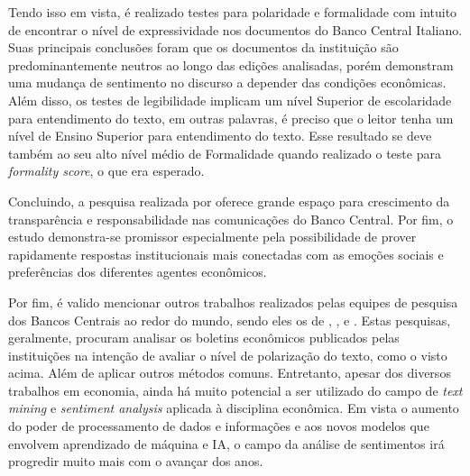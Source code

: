     


Tendo isso em vista, é realizado testes para polaridade e formalidade com intuito de encontrar o nível de expressividade nos documentos do Banco Central Italiano. Suas principais conclusões foram que os documentos da instituição são predominantemente neutros ao longo das edições analisadas, porém demonstram uma mudança de sentimento no discurso a depender das condições econômicas. Além disso, os testes de legibilidade implicam um nível Superior de escolaridade para entendimento do texto, em outras palavras, é preciso que o leitor tenha um nível de Ensino Superior para entendimento do texto. Esse resultado se deve também ao seu alto nível médio de Formalidade quando realizado o teste para \textit{formality score}, o que era esperado.

Concluindo, a pesquisa realizada por  oferece grande espaço para crescimento da transparência e responsabilidade nas comunicações do Banco Central. Por fim, o estudo demonstra-se promissor especialmente pela possibilidade de prover rapidamente respostas institucionais mais conectadas com as emoções sociais e preferências dos diferentes agentes econômicos.

Por fim, é valido mencionar outros trabalhos realizados pelas equipes de pesquisa dos Bancos Centrais ao redor do mundo, sendo eles os de , ,  e . Estas pesquisas, geralmente, procuram analisar os boletins econômicos publicados pelas instituições na intenção de avaliar o nível de polarização do texto, como o visto acima. Além de aplicar outros métodos comuns. Entretanto, apesar dos diversos trabalhos em economia, ainda há muito potencial a ser utilizado do campo de \textit{text mining} e \textit{sentiment analysis} aplicada à disciplina econômica. Em vista o aumento do poder de processamento de dados e informações e aos novos modelos que envolvem aprendizado de máquina e IA, o campo da análise de sentimentos irá progredir muito mais com o avançar dos anos.

